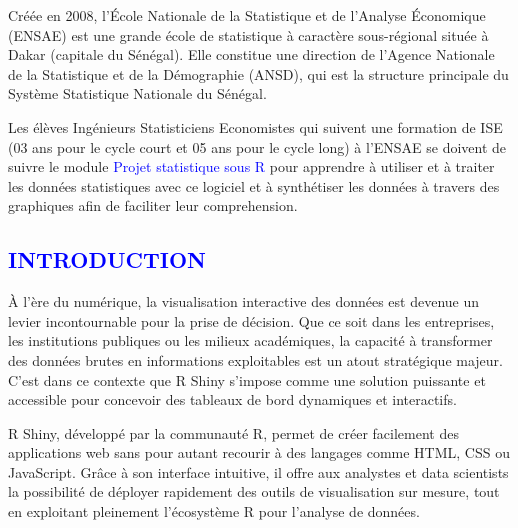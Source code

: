 \documentclass[
]{article}
\author{}
\date{\vspace{-2.5em}}
\begin{document}


\newpage


\renewcommand{\contentsname}{\textcolor{blue}{Sommaire}}

\textcolor{blue}{\tableofcontents}

\newpage

\begin{tcolorbox}[colback=white,colframe=blue, title=Avant-propos ]

Créée en 2008, l’École Nationale de la Statistique et de l’Analyse Économique (ENSAE) est une grande école de statistique à caractère sous-régional située à Dakar (capitale du Sénégal). Elle constitue une direction de l’Agence Nationale de la Statistique et de la Démographie (ANSD), qui est la structure principale du Système Statistique Nationale du Sénégal. 


  Les élèves Ingénieurs Statisticiens Economistes qui suivent une formation de ISE (03 ans pour le cycle court et 05 ans pour le cycle long) à l'ENSAE  se doivent de suivre le module \textcolor{blue}{Projet statistique sous R } pour apprendre à utiliser et à traiter les données statistiques avec ce logiciel et à synthétiser les données à travers des graphiques afin de faciliter leur comprehension. 
  
  
  
\end{tcolorbox}

\newpage

\textcolor{blue}{\section*{INTRODUCTION}}

À l'ère du numérique, la visualisation interactive des données est
devenue un levier incontournable pour la prise de décision. Que ce soit
dans les entreprises, les institutions publiques ou les milieux
académiques, la capacité à transformer des données brutes en
informations exploitables est un atout stratégique majeur. C'est dans ce
contexte que R Shiny s'impose comme une solution puissante et accessible
pour concevoir des tableaux de bord dynamiques et interactifs.

R Shiny, développé par la communauté R, permet de créer facilement des
applications web sans pour autant recourir à des langages comme HTML,
CSS ou JavaScript. Grâce à son interface intuitive, il offre aux
analystes et data scientists la possibilité de déployer rapidement des
outils de visualisation sur mesure, tout en exploitant pleinement
l'écosystème R pour l'analyse de données.
\end{document}
